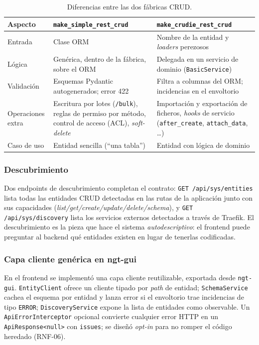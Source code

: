 \begin{table}[!htbp]
\caption{Diferencias entre las dos fábricas CRUD.}
\label{tab:factories}
\centering
\begin{tabular}{|p{2.6cm}|p{5cm}|p{5cm}|}
\hline
\textbf{Aspecto} & \texttt{make\_\allowbreak simple\_\allowbreak rest\_\allowbreak crud} & \texttt{make\_\allowbreak crudie\_\allowbreak rest\_\allowbreak crud} \\ \hline
Entrada & Clase ORM & Nombre de la entidad y \emph{loaders} perezosos \\ \hline
Lógica & Genérica, dentro de la fábrica, sobre el ORM & Delegada en un servicio de dominio (\texttt{BasicService}) \\ \hline
Validación & Esquemas Pydantic autogenerados; error 422 & Filtra a columnas del ORM; incidencias en el envoltorio \\ \hline
Operaciones extra & Escritura por lotes (\texttt{/bulk}), reglas de permiso por método, control de acceso (ACL), \emph{soft-delete} & Importación y exportación de ficheros, \emph{hooks} de servicio (\texttt{after\_create}, \texttt{attach\_data}, \ldots) \\ \hline
Caso de uso & Entidad sencilla (``una tabla'') & Entidad con lógica de dominio \\ \hline
\end{tabular}
\end{table}


\subsubsection{Descubrimiento}
Dos endpoints de descubrimiento completan el contrato:
\texttt{GET /api/sys/entities} lista todas las entidades CRUD detectadas en
las rutas de la aplicación junto con sus capacidades
(\emph{list/get/create/update/delete/schema}), y
\texttt{GET /api/sys/discovery} lista los servicios externos detectados a
través de Traefik. El descubrimiento es la pieza que hace el sistema
\emph{autodescriptivo}: el frontend puede preguntar al backend qué entidades
existen en lugar de tenerlas codificadas.

\subsubsection{Capa cliente genérica en ngt-gui}
En el frontend se implementó una capa cliente reutilizable, exportada desde
\texttt{ngt-gui}. \texttt{EntityClient} ofrece un cliente tipado por
\emph{path} de entidad; \texttt{SchemaService} cachea el esquema por entidad y
lanza error si el envoltorio trae incidencias de tipo \texttt{ERROR};
\texttt{Discovery\allowbreak Service} expone la lista de entidades como observable. Un
\texttt{ApiErrorInterceptor} opcional convierte cualquier error HTTP en un
\texttt{ApiResponse<null>} con \texttt{issues}; se diseñó \emph{opt-in} para
no romper el código heredado (RNF-06).

